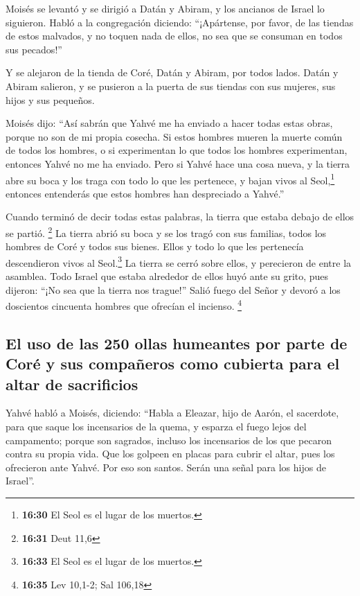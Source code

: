 \begin{paracol}{2}
 Moisés se levantó y se dirigió a Datán y Abiram, y los
ancianos de Israel lo siguieron.  Habló a la congregación
diciendo: ``¡Apártense, por favor, de las tiendas de estos malvados, y
no toquen nada de ellos, no sea que se consuman en todos sus pecados!''

 Y se alejaron de la tienda de Coré, Datán y Abiram, por
todos lados. Datán y Abiram salieron, y se pusieron a la puerta de sus
tiendas con sus mujeres, sus hijos y sus pequeños.

 Moisés dijo: ``Así sabrán que Yahvé me ha enviado a
hacer todas estas obras, porque no son de mi propia cosecha.
 Si estos hombres mueren la muerte común de todos los
hombres, o si experimentan lo que todos los hombres experimentan,
entonces Yahvé no me ha enviado.  Pero si Yahvé hace una
cosa nueva, y la tierra abre su boca y los traga con todo lo que les
pertenece, y bajan vivos al Seol,\footnote{\textbf{16:30} El Seol es el
  lugar de los muertos.} entonces entenderás que estos hombres han
despreciado a Yahvé.''

 Cuando terminó de decir todas estas palabras, la tierra
que estaba debajo de ellos se partió. \footnote{\textbf{16:31} Deut 11,6}
 La tierra abrió su boca y se los tragó con sus familias,
todos los hombres de Coré y todos sus bienes.  Ellos y
todo lo que les pertenecía descendieron vivos al Seol.\footnote{\textbf{16:33}
  El Seol es el lugar de los muertos.} La tierra se cerró sobre ellos, y
perecieron de entre la asamblea.  Todo Israel que estaba
alrededor de ellos huyó ante su grito, pues dijeron: ``¡No sea que la
tierra nos trague!''  Salió fuego del Señor y devoró a
los doscientos cincuenta hombres que ofrecían el incienso. \footnote{\textbf{16:35}
  Lev 10,1-2; Sal 106,18}

\hypertarget{el-uso-de-las-250-ollas-humeantes-por-parte-de-coruxe9-y-sus-compauxf1eros-como-cubierta-para-el-altar-de-sacrificios}{%
\subsection{El uso de las 250 ollas humeantes por parte de Coré y sus
compañeros como cubierta para el altar de
sacrificios}\label{el-uso-de-las-250-ollas-humeantes-por-parte-de-coruxe9-y-sus-compauxf1eros-como-cubierta-para-el-altar-de-sacrificios}}

 Yahvé habló a Moisés, diciendo:  ``Habla
a Eleazar, hijo de Aarón, el sacerdote, para que saque los incensarios
de la quema, y esparza el fuego lejos del campamento; porque son
sagrados,  incluso los incensarios de los que pecaron
contra su propia vida. Que los golpeen en placas para cubrir el altar,
pues los ofrecieron ante Yahvé. Por eso son santos. Serán una señal para
los hijos de Israel''.


\end{paracol}
